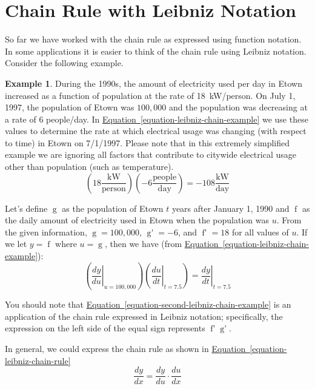 \documentclass[12pt,]{book}
\theoremstyle{plain}
\theoremstyle{definition}
\newtheorem{example}[theorem]{Example}
\numberwithin{equation}{section}
\newcommand{\fe}[2]{\mathop{{#1}{\left(#2\right)}}}
\newcommand{\fd}[1]{#1'}
\newcommand{\lz}[2]{\frac{d#1}{d#2}}
\newcommand{\lzoa}[3]{\left.{\frac{d#1}{d#2}}\right|_{#3}}
\begin{document}
\section[Chain Rule with Leibniz Notation]{Chain Rule with Leibniz Notation}\label{section-chain-rule-and-leibniz}
So far we have worked with the chain rule as expressed using function notation.  In some applications it is easier to think of the chain rule using Leibniz notation. Consider the following example.%
\begin{example}\label{example-17}
During the 1990s, the amount of electricity used per day in Etown increased as a function of population at the rate of \SI{18}{\kilo\watt}/person.  On July 1, 1997, the population of Etown was \(100{,}000\) and the population was decreasing at a rate of 6 people/day.  In \hyperref[equation-leibniz-chain-example]{Equation~\ref*{equation-leibniz-chain-example}} we use these values to determine the rate at which electrical usage was changing (with respect to time) in Etown on 7/1/1997.  Please note that in this extremely simplified example we are ignoring all factors that contribute to citywide electrical usage other than population (such as temperature).%
\begin{equation}\left(18\frac{\text{kW}}{\text{person}}\right)\left(-6\frac{\text{people}}{\text{day}}\right)=-108\frac{\text{kW}}{\text{day}}\label{equation-leibniz-chain-example}\end{equation}\par
Let's define \(\fe{g}{t}\)  as the population of Etown \(t\) years after January 1, 1990 and \(\fe{f}{u}\) as the daily amount of electricity used in Etown when the population was \(u\).  From the given information, \(\fe{g}{7.5}=100{,}000\), \(\fe{\fd{g}}{7.5}=-6\), and \(\fe{\fd{f}}{u}=18\) for all values of \(u\).  If we let \(y=\fe{f}{u}\) where \(u=\fe{g}{t}\), then we have (from \hyperref[equation-leibniz-chain-example]{Equation~\ref*{equation-leibniz-chain-example}}):%
\begin{equation}\left(\lzoa{y}{u}{u=100{,}000}\right)\left(\lzoa{u}{t}{t=7.5}\right)=\lzoa{y}{t}{t=7.5}\label{equation-second-leibniz-chain-example}\end{equation}\par
You should note that \hyperref[equation-second-leibniz-chain-example]{Equation~\ref*{equation-second-leibniz-chain-example}} is an application of the chain rule expressed in Leibniz notation; specifically, the expression on the left side of the equal sign represents \(\fe{\fd{f}}{\fe{g}{7.5}}\fe{\fd{g}}{7.5}\).%
\end{example}
\par
In general, we could express the chain rule as shown in \hyperref[equation-leibniz-chain-rule]{Equation~\ref*{equation-leibniz-chain-rule}}%
\begin{equation}\lz{y}{x}=\lz{y}{u}\cdot\lz{u}{x}\label{equation-leibniz-chain-rule}\end{equation}\typeout{************************************************}
\typeout{************************************************}
\end{document}
